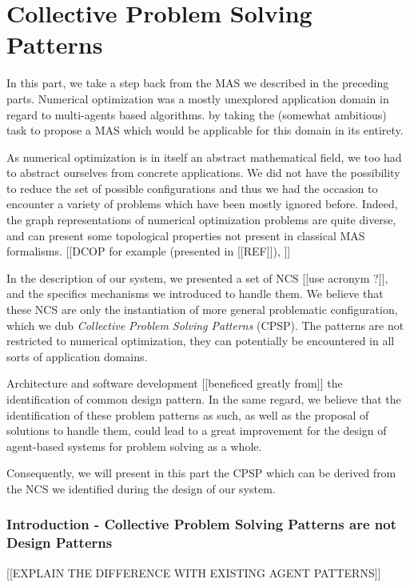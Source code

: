 \part{Collective Problem Solving Patterns}\label{CPSP}

In this part, we take a step back from the MAS we described in the preceding parts.
Numerical optimization was a mostly unexplored application domain in regard to multi-agents based algorithms. by taking the (somewhat ambitious) task to propose a MAS which would be applicable for this domain in its entirety.

As numerical optimization is in itself an abstract mathematical field, we too had to abstract ourselves from concrete applications. We did not have the possibility to reduce the set of possible configurations and thus we had the occasion to encounter a variety of problems which have been mostly ignored before. Indeed, the graph representations of numerical optimization problems are quite diverse, and can present some topological properties not present in classical MAS formalisms. [[DCOP for example (presented in [[REF]]), ]]

In the description of our system, we presented a set of NCS [[use acronym ?]], and the specifics mechanisms we introduced to handle them. We believe that these NCS are only the instantiation of more general problematic configuration, which we dub \emph{Collective Problem Solving Patterns} (CPSP). The patterns are not restricted to numerical optimization, they can potentially be encountered in all sorts of application domains.

Architecture and software development [[beneficed greatly from]] the identification of common design pattern. In the same regard, we believe that the identification of these problem patterns as such, as well as the proposal of solutions to handle them, could lead to a great improvement for the design of agent-based systems for problem solving as a whole.

Consequently, we will present in this part the CPSP which can be derived from the NCS we identified during the design of our system.


\section{Introduction - Collective Problem Solving Patterns are not Design Patterns}

[[EXPLAIN THE DIFFERENCE WITH EXISTING AGENT PATTERNS]]

